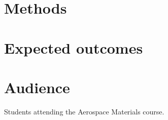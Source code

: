 \documentclass[review]{elsarticle}
\begin{document}
\section{Methods}



\section{Expected outcomes}

\section{Audience}

Students attending the Aerospace Materials course.
\end{document}
